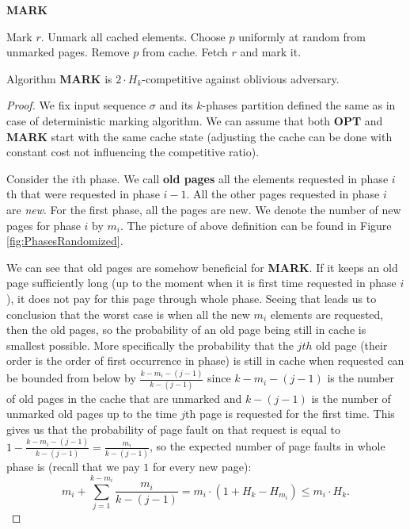 \begin{algorithm}
\caption{\textbf{MARK}}
\label{alg:MARK}
\begin{algorithmic}[1]
    \State Mark $r$.
  \Else
	\State Unmark all cached elements.
      \EndIf
      \State Choose $p$ uniformly at random from unmarked pages.
      \State Remove $p$ from cache.
    \EndIf
    \State Fetch $r$ and mark it.
  \EndIf
\EndFor
\end{algorithmic}
\end{algorithm}
\begin{theorem}
\cite{markcom} Algorithm \textbf{MARK} is $2 \cdot H_k$-competitive against oblivious 
adversary.
\end{theorem}
\begin{proof}
We fix input sequence $\sigma$ and its $k$-phases partition defined the same as 
in case of deterministic marking algorithm. We can assume that both 
\textbf{OPT} and \textbf{MARK} start with the same cache state (adjusting the 
cache can be done with constant cost not influencing the competitive ratio).

Consider the $i$th phase. We call \textbf{old pages} all the elements requested 
in 
phase $i$th that were requested in phase $i-1$. All the other pages requested 
in phase $i$ are \textit{new}. For the first phase, all the pages are new. We 
denote the number of new pages for phase $i$ by $m_i$. The picture of above 
definition can be found in Figure \ref{fig:PhasesRandomized}.


We can see that old pages are somehow beneficial for \textbf{MARK}. If it keeps 
an old page sufficiently long (up to the moment when it is first time requested 
in phase $i$), it does not pay for this page through whole phase. Seeing that 
leads us to conclusion that the worst case is when all the new 
$m_i$ elements are requested, then the old pages, so the probability of an old 
page being still in cache is smallest possible. More specifically the 
probability that the $jth$ old page (their order is the order of first 
occurrence 
in phase) is still in cache when requested can be bounded from below by 
$\frac{k-m_i-(j-1)}{k-(j-1)}$ since $k-m_i-(j-1)$ is the number of old pages in 
the cache that are unmarked and  $k-(j-1)$ is the number of unmarked old pages 
up to the time $j$th page is requested for the first time. This gives us that 
the probability of page fault on that request is equal to $1 - 
\frac{k-m_i-(j-1)}{k-(j-1)} = \frac{m_i}{k-(j-1)}$, so the expected number of 
page faults in whole phase is (recall that we pay $1$ for every new page):
$$ m_i + \sum_{j=1}^{k - m_i}\frac{m_i}{k-(j-1)} = m_i\cdot(1+H_k-H_{m_i}) \leq 
m_i \cdot H_k.$$


\end{proof}
